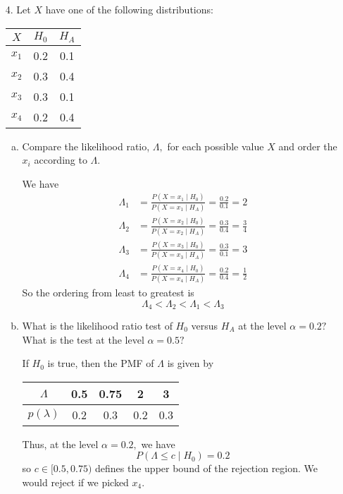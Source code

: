 \documentclass{article}
\begin{document}
\begin{itemize}
	\item[4.] Let $X$ have one of the following distributions:
		\begin{center}
			\begin{tabular}{ccc}
				$X$ & $H_0$ & $H_A$ \\
				\hline
				$x_1$ & 0.2 & 0.1 \\
				$x_2$ & 0.3 & 0.4 \\
				$x_3$ & 0.3 & 0.1 \\
				$x_4$ & 0.2 & 0.4
			\end{tabular}
		\end{center}

		\begin{enumerate}[a.]
			\item Compare the likelihood ratio, $\Lambda,$ for each possible value $X$ and order the $x_i$ according to $\Lambda.$
				\begin{soln}
					We have 
					\begin{align*}
						\Lambda_1 &= \frac{P(X=x_1\mid H_0)}{P(X=x_1\mid H_A)} = \frac{0.2}{0.1} = 2 \\
						\Lambda_2 &= \frac{P(X=x_2\mid H_0)}{P(X=x_2\mid H_A)}=\frac{0.3}{0.4}=\frac{3}{4} \\
						\Lambda_3 &= \frac{P(X=x_3\mid H_0)}{P(X=x_3\mid H_A)} = \frac{0.3}{0.1} = 3 \\
						\Lambda_4 &= \frac{P(X=x_4\mid H_0)}{P(X=x_4\mid H_A)} = \frac{0.2}{0.4}=\frac{1}{2}
					\end{align*}
					So the ordering from least to greatest is \[\Lambda_4<\Lambda_2<\Lambda_1<\Lambda_3\]
				\end{soln}

			\item What is the likelihood ratio test of $H_0$ versus $H_A$ at the level $\alpha=0.2?$ What is the test at the level $\alpha=0.5?$
				\begin{soln}
					If $H_0$ is true, then the PMF of $\Lambda$ is given by 
					\begin{center}
						\begin{tabular}{c||c|c|c|c}
							$\Lambda$ & 0.5 & 0.75 & 2 & 3 \\
							\hline
							$p(\lambda)$ & 0.2 & 0.3 & 0.2 & 0.3
						\end{tabular}
					\end{center}
					Thus, at the level $\alpha=0.2,$ we have \[P(\Lambda\le c \mid H_0) = 0.2\] so $c\in [0.5, 0.75)$ defines the upper bound of the rejection region. We would reject if we picked $x_4.$
						

\end{soln}
\end{enumerate}
\end{itemize}
\end{document}
